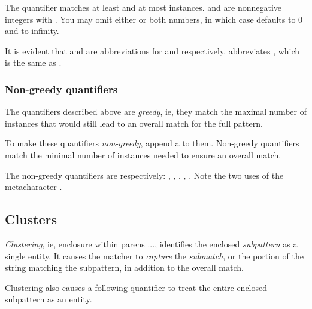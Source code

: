{The quantifier  matches at least 
and at most  instances.   and
 are nonnegative integers with .  You may omit either or both numbers, in which case
 defaults to 0 and  to
infinity.

It is evident that \p{+} and  are abbreviations
for  and  respectively.
\p{*} abbreviates \p{{,}}, which is the same
as .


\subsubsection{Non-greedy quantifiers}

The quantifiers described above are {\em greedy}, ie,
they match the  maximal number of instances that would
still lead to an overall match for the full pattern.


To make these quantifiers {\em non-greedy}, append
a  to them.  Non-greedy quantifiers match
the minimal number of instances needed to ensure an
overall match.


The non-greedy quantifiers are respectively:
, , , , .
Note the two uses of the metacharacter .

\subsection{Clusters}

{\em Clustering}, ie, enclosure within parens
\p{(}...\p{)}, identifies the enclosed {\em subpattern}
as a single entity.  It causes the matcher to {\em capture}
the {\em submatch}, or the portion of the string
matching the subpattern, in addition to the
overall match.


Clustering also causes a following quantifier to treat
the entire enclosed subpattern as an entity.

}
